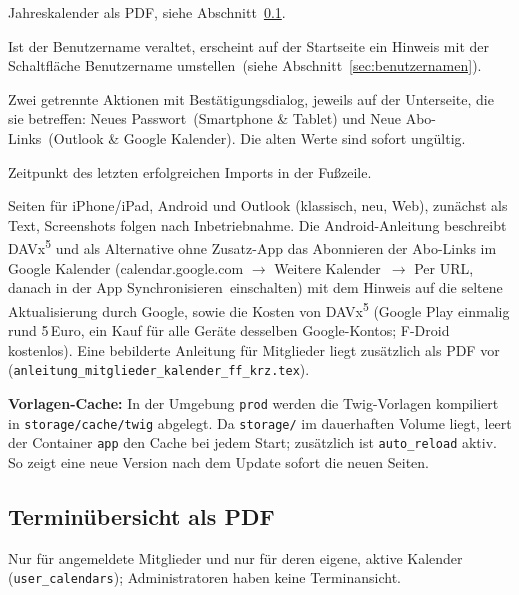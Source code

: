 \documentclass[a4paper,fontsize=10pt]{scrartcl}
\newcommand{\code}[1]{\texttt{#1}}
\begin{document}
\begin{description}[style=nextline, leftmargin=1.2cm]
    Jahreskalender als PDF, siehe Abschnitt~\ref{sec:pdf}.
  \item[Benutzername]
    Ist der Benutzername veraltet, erscheint auf der Startseite ein Hinweis
    mit der Schaltfläche \glqq Benutzername umstellen\grqq\ (siehe
    Abschnitt~\ref{sec:benutzernamen}).
  \item[Neu generieren]
    Zwei getrennte Aktionen mit Bestätigungsdialog, jeweils auf der
    Unterseite, die sie betreffen: \glqq Neues Passwort\grqq\ (Smartphone
    \& Tablet) und \glqq Neue Abo-Links\grqq\ (Outlook \& Google
    Kalender). Die alten Werte sind sofort ungültig.
  \item[Betriebsinformation]
    Zeitpunkt des letzten erfolgreichen Imports in der Fußzeile.
  \item[Anleitungen]
    Seiten für iPhone/iPad, Android und Outlook (klassisch, neu, Web),
    zunächst als Text, Screenshots folgen nach Inbetriebnahme. Die
    Android-Anleitung beschreibt DAVx\textsuperscript{5} und als Alternative
    ohne Zusatz-App das Abonnieren der Abo-Links im Google Kalender
    (calendar.google.com $\rightarrow$ \glqq Weitere Kalender\grqq\
    $\rightarrow$ \glqq Per URL\grqq, danach in der App
    \glqq Synchronisieren\grqq\ einschalten) mit dem Hinweis auf die
    seltene Aktualisierung durch Google, sowie die Kosten von
    DAVx\textsuperscript{5} (Google Play einmalig rund 5\,Euro, ein Kauf für
    alle Geräte desselben Google-Kontos; F-Droid kostenlos). Eine
    bebilderte Anleitung für Mitglieder liegt zusätzlich als PDF vor
    (\code{anleitung\_mitglieder\_kalender\_ff\_krz.tex}).
\end{description}

\textbf{Vorlagen-Cache:} In der Umgebung \code{prod} werden die
Twig-Vorlagen kompiliert in \code{storage/cache/twig} abgelegt. Da
\code{storage/} im dauerhaften Volume liegt, leert der Container \code{app}
den Cache bei jedem Start; zusätzlich ist \code{auto\_reload} aktiv. So zeigt
eine neue Version nach dem Update sofort die neuen Seiten.

\subsection{Terminübersicht als PDF}\label{sec:pdf}

Nur für angemeldete Mitglieder und nur für deren eigene, aktive Kalender
(\code{user\_calendars}); Administratoren haben keine Terminansicht.
\end{document}
